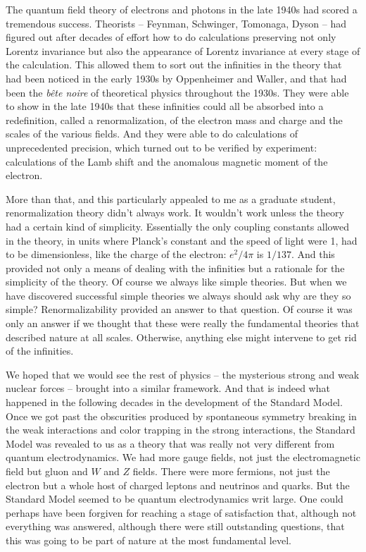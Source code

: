 The quantum field theory of electrons and photons in the late 1940s had scored a tremendous success. Theorists -- Feynman, Schwinger, Tomonaga, Dyson -- had figured out after decades of effort how to do  calculations preserving not only Lorentz invariance but also the appearance of Lorentz invariance at every stage of the calculation. This allowed them to sort out the infinities in the theory that had been noticed in the early 1930s by Oppenheimer and  Waller, and that had been the {\it  b\^ete noire} of theoretical physics throughout the 1930s. They were able to show in the late 1940s that these infinities could all be absorbed into a redefinition, called a renormalization, of the electron mass and charge and the scales of the various fields. And they were able to do calculations of unprecedented precision, which turned out to be verified by experiment: calculations of the Lamb shift and the anomalous magnetic moment of the electron. 

More than that, and this particularly appealed to me as a graduate student, renormalization theory didn't always work. It wouldn't work unless the theory had a certain kind of simplicity. 
Essentially  the only coupling constants allowed in the theory, in units where Planck's constant and the speed of light were 1, had to be dimensionless, like the charge of the electron: $e^2/4\pi$ is $1/137$. And this provided not only a means of dealing with the infinities but a rationale for the simplicity of the theory. Of course we always like simple theories. But when we have discovered successful simple theories we always should ask why are they so simple? Renormalizability provided an answer to that question. Of course it was only an answer if we thought that these were really the fundamental theories that described nature at all scales. Otherwise, anything else might intervene to get rid of the infinities.

We hoped that we would see the rest of physics -- the mysterious strong and weak nuclear forces -- brought into a similar framework. And that is indeed what happened in the following decades in the development of the Standard Model. Once we got past the obscurities produced by spontaneous symmetry breaking in the weak interactions and color trapping in the strong interactions, the Standard Model was revealed to us as a theory that was really not very different from quantum electrodynamics. We had more gauge fields, not just the electromagnetic field but gluon and  $W$ and $Z$ fields. There were more fermions, not just the electron but a whole host of charged leptons and neutrinos and quarks. But the Standard Model seemed to be quantum electrodynamics writ large. One could perhaps  have been forgiven for reaching a stage of satisfaction that, although not everything was answered, although there were still outstanding questions, that this was going to be part of nature at the most fundamental level. 

